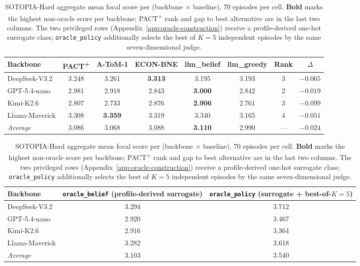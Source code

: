 \begin{table}[h]
\centering\small
\caption{SOTOPIA-Hard aggregate mean focal score per (backbone $\times$ baseline), $70$ episodes per cell. \textbf{Bold} marks the highest non-oracle score per backbone; PACT\textsuperscript{+} rank and gap to best alternative are in the last two columns. The two privileged rows (Appendix~\ref{app:oracle-construction}) receive a profile-derived one-hot surrogate class; \texttt{oracle\_policy} additionally selects the best of $K{=}5$ independent episodes by the same seven-dimensional judge.}
\label{tab:sotopia-aggregate}
\begin{tabular}{lccccccc}
\toprule
Backbone & PACT\textsuperscript{+} & A-ToM-1 & ECON-BNE & llm\_belief & llm\_greedy & Rank & $\Delta$ \\
\midrule
DeepSeek-V3.2 & 3.248 & 3.261 & \textbf{3.313} & 3.195 & 3.193 & 3 & $-0.065$ \\
GPT-5.4-nano & 2.981 & 2.918 & 2.843 & \textbf{3.000} & 2.842 & 2 & $-0.019$ \\
Kimi-K2.6 & 2.807 & 2.733 & 2.876 & \textbf{2.906} & 2.761 & 3 & $-0.099$ \\
Llama-Maverick & 3.308 & \textbf{3.359} & 3.319 & 3.340 & 3.165 & 4 & $-0.051$ \\
\midrule
\emph{Average} & 3.086 & 3.068 & 3.088 & \textbf{3.110} & 2.990 & --- & $-0.024$ \\
\bottomrule
\end{tabular}

\vspace{4pt}
\begin{tabular}{lcc}
\toprule
Backbone & \texttt{oracle\_belief} (profile-derived surrogate) & \texttt{oracle\_policy} (surrogate + best-of-$K{=}5$) \\
\midrule
DeepSeek-V3.2 & 3.294 & 3.712 \\
GPT-5.4-nano  & 2.920 & 3.467 \\
Kimi-K2.6     & 2.916 & 3.364 \\
Llama-Maverick & 3.282 & 3.618 \\
\midrule
\emph{Average} & 3.103 & 3.540 \\
\bottomrule
\end{tabular}
\end{table}


